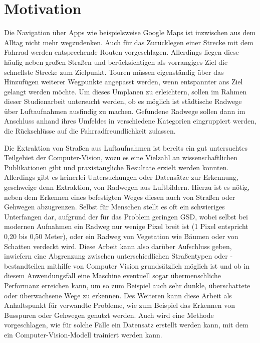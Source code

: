 \chapter{Motivation} \label{sec:motivation}

Die Navigation über Apps wie beispielsweise Google Maps ist inzwischen aus dem Alltag nicht mehr wegzudenken.
Auch für das Zurücklegen einer Strecke mit dem Fahrrad werden entsprechende Routen vorgeschlagen.
Allerdings liegen diese häufig neben großen Straßen und berücksichtigen als vorrangiges Ziel die schnellste Strecke zum Zielpunkt.
Touren müssen eigenständig über das Hinzufügen weiterer Wegpunkte angepasst werden, wenn entspannter ans Ziel gelangt werden möchte.
Um dieses Umplanen zu erleichtern, sollen im Rahmen dieser Studienarbeit untersucht werden, ob es möglich ist 
städtische Radwege über Luftaufnahmen ausfindig zu machen.
Gefundene Radwege sollen dann im Anschluss anhand ihres Umfeldes in verschiedene Kategorien eingruppiert werden, die Rückschlüsse auf die Fahrradfreundlichkeit zulassen.

Die Extraktion von Straßen aus Luftaufnahmen ist bereits
ein gut untersuchtes Teilgebiet der Computer-Vision, wozu es eine Vielzahl an wissenschaftlichen Publikationen gibt
und praxistaugliche Resultate erzielt werden konnten. \\
Allerdings gibt es keinerlei Untersuchungen oder Datensätze zur Erkennung, geschweige denn Extraktion, 
von Radwegen aus Luftbildern. Hierzu ist es nötig, neben dem Erkennen eines befestigten Weges  
diesen auch von Straßen oder Gehwegen abzugrenzen. Selbst für 
Menschen stellt es oft ein schwieriges Unterfangen dar, aufgrund der für das Problem geringen \ac{GSD}, wobei selbst bei modernen 
Aufnahmen ein Radweg nur wenige Pixel breit ist (1 Pixel entspricht 0,20 bis 0,50 Meter), oder ein Radweg von Vegetation wie Bäumen oder von Schatten verdeckt wird.
Diese Arbeit kann also darüber Aufschluss geben, inwiefern eine Abgrenzung zwischen unterschiedlichen Straßentypen oder -bestandteilen mithilfe von Computer Vision
grundsätzlich möglich ist und ob in diesem Anwendungsfall eine Maschine eventuell sogar übermenschliche Performanz 
erreichen kann, um so zum Beispiel auch sehr dunkle, überschattete oder überwachsene Wege zu erkennen. 
Des Weiteren kann diese Arbeit als Anhaltspunkt für verwandte Probleme, wie zum Beispiel das Erkennen von Busspuren 
oder Gehwegen genutzt werden. Auch wird eine Methode vorgeschlagen, wie für solche Fälle ein Datensatz erstellt werden 
kann, mit dem ein Computer-Vision-Modell trainiert werden kann. 


